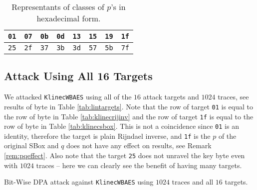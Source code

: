 \begin{table}[h]
	\begin{center}
	\begin{tabular}{| c | c | c | c | c | c | c | c |}
		\hline
		{\tt 01} & {\tt 07} & {\tt 0b} & {\tt 0d} & {\tt 13} & {\tt 15} & {\tt 19} & {\tt 1f} \\
		\hline
		{\tt 25} & {\tt 2f} & {\tt 37} & {\tt 3b} & {\tt 3d} & {\tt 57} & {\tt 5b} & {\tt 7f} \\
		\hline
	\end{tabular}
	\end{center}
\caption{Representants of classes of $p$'s in hexadecimal form.}
\label{tab:classrepre}
\end{table}



\subsection{Attack Using All 16 Targets}

We attacked {\tt KlinecWBAES} using all of the $16$ attack targets and $1024$ traces, see results of  byte in Table \ref{tab:lintargets}. Note that the row of target {\tt 01} is equal to the row of  byte in Table \ref{tab:klinecrijinv} and the row of target {\tt 1f} is equal to the row of  byte in Table \ref{tab:klinecsbox}. This is not a coincidence since {\tt 01} is an identity, therefore the target is plain Rijndael inverse, and {\tt 1f} is the $p$ of the original SBox and $q$ does not have any effect on results, see Remark \ref{rem:pqeffect}. Also note that the target {\tt 25} does not unravel the  key byte even with $1024$ traces -- here we can clearly see the benefit of having many targets.

\begin{landscape}
\begin{table}[H]
	\begin{center}
	
	\end{center}
\caption{Bit-Wise DPA attack against {\tt KlinecWBAES} using $1024$ traces and all $16$ targets.}
\label{tab:lintargets}
\end{table}
\end{landscape}


